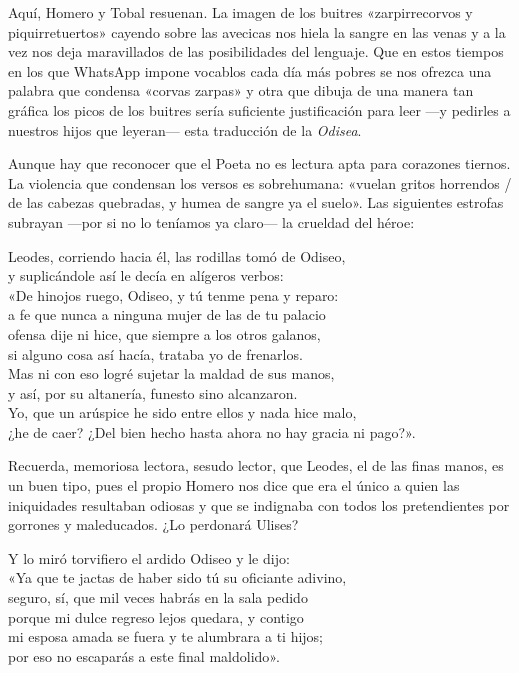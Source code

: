 Aquí, Homero y Tobal resuenan. La imagen de los buitres «zarpirrecorvos y piquirretuertos» cayendo sobre las avecicas nos hiela la sangre en las venas y a la vez nos deja maravillados de las posibilidades del lenguaje. Que en estos tiempos en los que WhatsApp impone vocablos cada día más pobres se nos ofrezca una palabra que condensa «corvas zarpas» y otra que dibuja de una manera tan gráfica los picos de los buitres sería suficiente justificación para leer ---y pedirles a nuestros hijos que leyeran--- esta traducción de la \emph{Odisea}.

Aunque hay que reconocer que el Poeta no es lectura apta para corazones tiernos. La violencia que condensan los versos es sobrehumana: «vuelan gritos horrendos / de las cabezas quebradas, y humea de sangre ya el suelo». Las siguientes estrofas subrayan ---por si no lo teníamos ya claro--- la crueldad del héroe:

\begin{versocita}
Leodes, corriendo hacia él, las rodillas tomó de Odiseo,\\
y suplicándole así le decía en alígeros verbos:\\
«De hinojos ruego, Odiseo, y tú tenme pena y reparo:\\
a fe que nunca a ninguna mujer de las de tu palacio\\
ofensa dije ni hice, que siempre a los otros galanos,\\
si alguno cosa así hacía, trataba yo de frenarlos.\\
Mas ni con eso logré sujetar la maldad de sus manos,\\
y así, por su altanería, funesto sino alcanzaron.\\
Yo, que un arúspice he sido entre ellos y nada hice malo,\\
¿he de caer? ¿Del bien hecho hasta ahora no hay gracia ni pago?».
\end{versocita}

Recuerda, memoriosa lectora, sesudo lector, que Leodes, el de las finas manos, es un buen tipo, pues el propio Homero nos dice que era el único a quien las iniquidades resultaban odiosas y que se indignaba con todos los pretendientes por gorrones y maleducados. ¿Lo perdonará Ulises?

\begin{versocita}
Y lo miró torvifiero el ardido Odiseo y le dijo:\\
«Ya que te jactas de haber sido tú su oficiante adivino,\\
seguro, sí, que mil veces habrás en la sala pedido\\
porque mi dulce regreso lejos quedara, y contigo\\
mi esposa amada se fuera y te alumbrara a ti hijos;\\
por eso no escaparás a este final maldolido».
\end{versocita}

